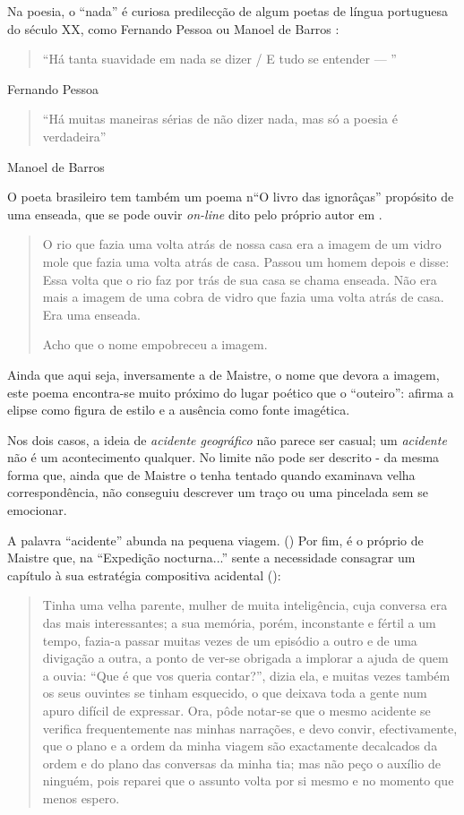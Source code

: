 \documentclass[12pt]{article}
\begin{document}
Na poesia, o ``nada'' é curiosa predilecção de algum poetas de língua
portuguesa do século XX, como Fernando Pessoa ou Manoel de Barros
\cite{manoel}:

\begin{quote}
  ``Há tanta suavidade em nada se dizer / E tudo se entender — ''
\end{quote}
Fernando Pessoa \cite{pessoa}


\begin{quote}
``Há muitas maneiras sérias de não dizer nada, mas só a poesia é verdadeira''
\end{quote}
Manoel de Barros \cite{manoelverso}

O poeta brasileiro tem também um poema n``O livro das ignorâças''
propósito de uma enseada, que se pode ouvir \emph{on-line} dito pelo
próprio autor em \cite{avidaebreve}.

\begin{quote}
  O rio que fazia uma volta atrás de nossa casa
era a imagem de um vidro mole que fazia uma
volta atrás de casa.
Passou um homem depois e disse: Essa volta
que o rio faz por trás de sua casa se chama
enseada.
Não era mais a imagem de uma cobra de vidro
que fazia uma volta atrás de casa.
Era uma enseada.

Acho que o nome empobreceu a imagem. 
\end{quote}

Ainda que aqui seja, inversamente a de Maistre, o nome que devora a
imagem, este poema encontra-se muito próximo do lugar poético que o
``outeiro'': afirma a elipse como figura de estilo e a ausência como
fonte imagética.

Nos dois casos, a ideia de \emph{acidente geográfico} não parece ser
casual; um \emph{acidente} não é um acontecimento qualquer. No limite
não pode ser descrito - da mesma forma que, ainda que de Maistre o
tenha tentado quando examinava velha correspondência, não conseguiu
descrever um traço ou uma pincelada sem se
emocionar. \cite[p.xxx?]{demaistre}

A palavra ``acidente'' abunda na pequena viagem. (\cite[pxxx, pxxx,
  pxxx, pxxx, pxxx]{demaistre}) Por fim, é o próprio de Maistre que,
na ``Expedição nocturna...''  sente a necessidade consagrar um
capítulo à sua estratégia compositiva acidental
(\cite[p.xxx?]{demaistre}):

\begin{quote}
  Tinha uma velha parente, mulher de muita inteligência, cuja conversa
  era das mais interessantes; a sua memória, porém, inconstante e
  fértil a um tempo, fazia-a passar muitas vezes de um episódio a
  outro e de uma divigação a outra, a ponto de ver-se obrigada a
  implorar a ajuda de quem a ouvia: ``Que é que vos queria contar?'',
  dizia ela, e muitas vezes também os seus ouvintes se tinham
  esquecido, o que deixava toda a gente num apuro difícil de
  expressar. Ora, pôde notar-se que o mesmo acidente se verifica
  frequentemente nas minhas narrações, e devo convir, efectivamente,
  que o plano e a ordem da minha viagem são exactamente decalcados da
  ordem e do plano das conversas da minha tia; mas não peço o auxílio
  de ninguém, pois reparei que o assunto volta por si mesmo e no
  momento que menos espero.
\end{quote}
\end{document}
